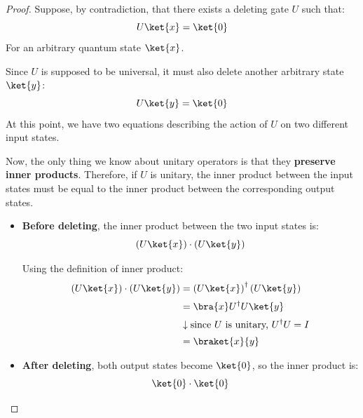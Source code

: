 \begin{proof}
    Suppose, by contradiction, that there exists a deleting gate $U$ such that:
    \begin{equation*}
        U\ket{x}=\ket{0}
    \end{equation*}
    For an arbitrary quantum state $\ket{x}$.

    \highspace
    Since $U$ is supposed to be universal, it must also delete another arbitrary state $\ket{y}$:
    \begin{equation*}
        U\ket{y}=\ket{0}
    \end{equation*}
    At this point, we have two equations describing the action of $U$ on two different input states.

    \highspace
    Now, the only thing we know about unitary operators is that they \textbf{preserve inner products}. Therefore, if $U$ is unitary, the inner product between the input states must be equal to the inner product between the corresponding output states.

    \begin{itemize}
        \item \textbf{Before deleting}, the inner product between the two input states is:
        \begin{equation*}
            \left(U\ket{x}\right) \cdot \left(U\ket{y}\right)
        \end{equation*}

        Using the definition of inner product:
        \begin{align*}
            \left(U\ket{x}\right)\cdot\left(U\ket{y}\right)
            &=
            \left(U\ket{x}\right)^{\dagger} \left(U\ket{y}\right) \\[.2em]
            &=
            \bra{x} U^{\dagger} U \ket{y} \\[.2em]
            &\downarrow \text{since $U$ is unitary, $U^{\dagger} U = I$} \\[.2em]
            &=
            \braket{x}{y}
        \end{align*}

        \item \textbf{After deleting}, both output states become $\ket{0}$, so the inner product is:
        \begin{equation*}
            \ket{0}\cdot\ket{0}
        \end{equation*}


\end{itemize}
\end{proof}
